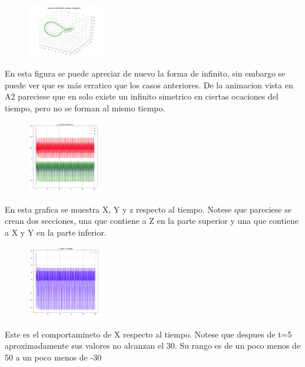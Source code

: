\documentclass[a4paper]{article}
\begin{document}
\begin{figure}[ht!]
\centering
\includegraphics[width=0.3\textwidth]{A3.png}
\caption{\label{fig:}}
\end{figure}

En esta figura se puede apreciar de nuevo la forma de infinito, sin embargo se puede ver que es más erratico que los casos anteriores. De la animacion vista en A2 pareciese que en solo existe un infinito simetrico en ciertas ocaciones del tiempo, pero no se forman al mismo tiempo.

\newpage

\begin{figure}[ht!]
\centering
\includegraphics[width=0.3\textwidth]{B3.png}
\caption{\label{fig:}}
\end{figure}

En esta grafica se muestra X, Y y z respecto al tiempo. Notese que pareciese se crean dos secciones, una que contiene a Z en la parte superior y una que contiene a X y Y en la parte inferior.  


\begin{figure}[ht!]
\centering
\includegraphics[width=0.3\textwidth]{C3.png}
\caption{\label{fig:}}
\end{figure}

Este es el comportamineto de X respecto al tiempo. Notese que despues de t=5 aproximadamente sus valores no alcanzan el 30. Su rango es de un poco menos de 50 a un poco menos de -30
\end{document}
